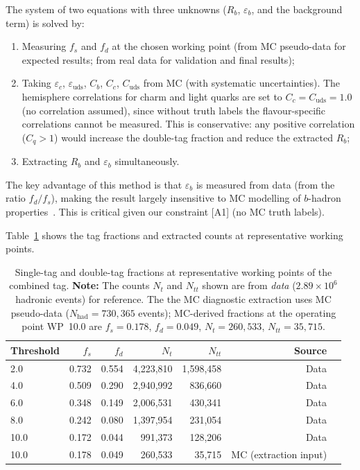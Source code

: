 \documentclass[11pt,a4paper]{article}
\begin{document}
The system of two equations with three unknowns ($R_b$, $\varepsilon_b$, and the
background term) is solved by:
\begin{enumerate}
\item Measuring $f_s$ and $f_d$ at the chosen working point (from MC pseudo-data
for expected results; from real data for validation and final results);
\item Taking $\varepsilon_c$, $\varepsilon_\mathrm{uds}$, $C_b$, $C_c$, $C_\mathrm{uds}$
from MC (with systematic uncertainties). The hemisphere correlations for charm
and light quarks are set to $C_c = C_\mathrm{uds} = 1.0$ (no correlation assumed),
since without truth labels the flavour-specific correlations cannot be measured.
This is conservative: any positive correlation ($C_q > 1$) would increase the
double-tag fraction and reduce the extracted $R_b$;
\item Extracting $R_b$ and $\varepsilon_b$ simultaneously.
\end{enumerate}

The key advantage of this method is that $\varepsilon_b$ is measured from data (from
the ratio $f_d / f_s$), making the result largely insensitive to MC modelling of
$b$-hadron properties~\cite{ALEPH:Rb:1996, LEP:HF:2001}. This is critical given
our constraint [A1] (no MC truth labels).

Table~\ref{tab:working_points} shows the tag fractions and extracted counts at
representative working points.

\begin{table}[htbp]
\centering
\caption{Single-tag and double-tag fractions at representative working points of
the combined tag. \textbf{Note:} The counts $N_t$ and $N_{tt}$ shown are from
\emph{data} ($2.89 \times 10^6$ hadronic events) for reference. The the MC diagnostic
extraction uses MC pseudo-data ($N_\mathrm{had} = 730{,}365$ events); MC-derived
fractions at the operating point WP~10.0 are $f_s = 0.178$, $f_d = 0.049$,
$N_t = 260{,}533$, $N_{tt} = 35{,}715$.}
\label{tab:working_points}
\begin{tabular}{lrrrrrl}
\toprule
Threshold & $f_s$ & $f_d$ & $N_t$ & $N_{tt}$ & Source \\
\midrule
2.0 & 0.732 & 0.554 & 4,223,810 & 1,598,458 & Data \\
4.0 & 0.509 & 0.290 & 2,940,992 & 836,660 & Data \\
6.0 & 0.348 & 0.149 & 2,006,531 & 430,341 & Data \\
8.0 & 0.242 & 0.080 & 1,397,954 & 231,054 & Data \\
10.0 & 0.172 & 0.044 & 991,373 & 128,206 & Data \\
\midrule
10.0 & 0.178 & 0.049 & 260,533 & 35,715 & MC (extraction input) \\
\bottomrule
\end{tabular}
\end{table}
\end{document}
